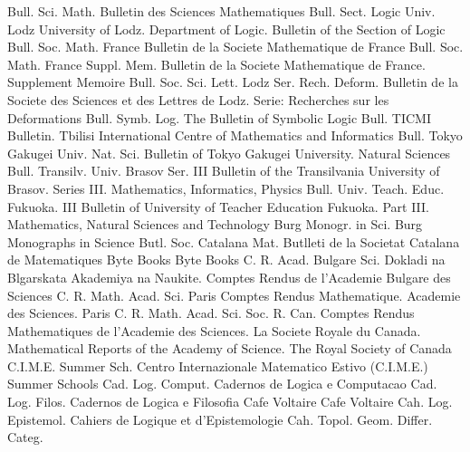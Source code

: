 {Bull. Sci. Math.}
{Bulletin des Sciences Mathematiques}
{Bull. Sect. Logic Univ. Lodz}
{University of Lodz. Department of Logic. Bulletin of the Section of Logic}
{Bull. Soc. Math. France}
{Bulletin de la Societe Mathematique de France}
{Bull. Soc. Math. France Suppl. Mem.}
{Bulletin de la Societe Mathematique de France. Supplement Memoire}
{Bull. Soc. Sci. Lett. Lodz Ser. Rech. Deform.}
{Bulletin de la Societe des Sciences et des Lettres de Lodz. Serie: Recherches sur les Deformations}
{Bull. Symb. Log.}
{The Bulletin of Symbolic Logic}
{Bull. TICMI}
{Bulletin. Tbilisi International Centre of Mathematics and Informatics}
{Bull. Tokyo Gakugei Univ. Nat. Sci.}
{Bulletin of Tokyo Gakugei University. Natural Sciences}
{Bull. Transilv. Univ. Brasov Ser. III}
{Bulletin of the Transilvania University of Brasov. Series III. Mathematics, Informatics, Physics}
{Bull. Univ. Teach. Educ. Fukuoka. III}
{Bulletin of University of Teacher Education Fukuoka. Part III. Mathematics, Natural Sciences and Technology}
{Burg Monogr. in Sci.}
{Burg Monographs in Science}
{Butl. Soc. Catalana Mat.}
{Butlleti de la Societat Catalana de Matematiques}
{Byte Books}
{Byte Books}
{C. R. Acad. Bulgare Sci.}
{Dokladi na Blgarskata Akademiya na Naukite. Comptes Rendus de l'Academie Bulgare des Sciences}
{C. R. Math. Acad. Sci. Paris}
{Comptes Rendus Mathematique. Academie des Sciences. Paris}
{C. R. Math. Acad. Sci. Soc. R. Can.}
{Comptes Rendus Mathematiques de l'Academie des Sciences. La Societe Royale du Canada. Mathematical Reports of the Academy of Science. The Royal Society of Canada}
{C.I.M.E. Summer Sch.}
{Centro Internazionale Matematico Estivo (C.I.M.E.) Summer Schools}
{Cad. Log. Comput.}
{Cadernos de Logica e Computacao}
{Cad. Log. Filos.}
{Cadernos de Logica e Filosofia}
{Cafe Voltaire}
{Cafe Voltaire}
{Cah. Log. Epistemol.}
{Cahiers de Logique et d'Epistemologie}
{Cah. Topol. Geom. Differ. Categ.}
